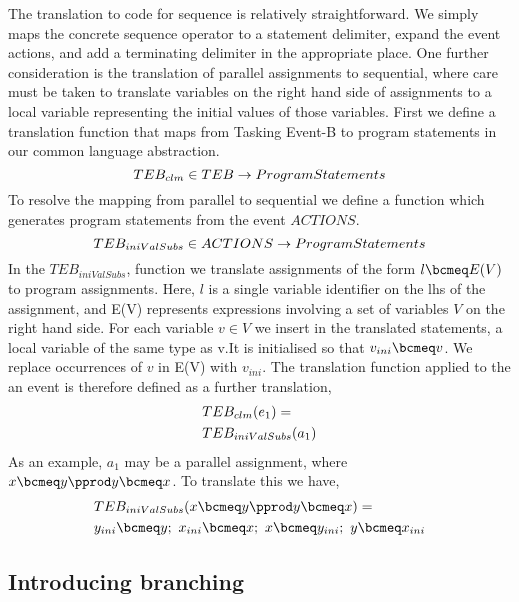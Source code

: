 The translation to code for sequence is relatively straightforward. We simply maps the concrete sequence operator to a statement delimiter, expand the event actions, and add a terminating delimiter in the appropriate place. One further consideration is the translation of parallel assignments to sequential, where care must be taken to translate variables on the right hand side of assignments to a local variable representing the initial values of those variables. First we define a translation function that maps from Tasking Event-B to program statements in our common language abstraction.   
\begin{equation}
TEB_{clm} \in  TEB \rightarrow ProgramStatements
\notag
\end{equation}
To resolve the mapping from parallel to sequential we define a function which generates program statements from the event $ACTIONS$. 
\begin{equation}
TEB_{iniValSubs} \in  ACTIONS \rightarrow ProgramStatements
\notag
\end{equation}
In the $TEB_{iniValSubs}$, function we translate assignments of the form $l \bcmeq E(V)$ to program assignments. Here, $l$ is a single variable identifier on the lhs of the assignment, and  E(V) represents expressions involving a set of variables $V$ on the right hand side. For each variable $v \in V$ we insert in the translated statements, a local variable of the same type as v.It is initialised so that $v_{ini} \bcmeq v$. We replace occurrences of $v$ in E(V) with $v_{ini}$. The translation function applied to the an event is therefore defined as a further translation,
%
\begin{equation}
\begin{split}
&TEB_{clm}(e_1) = \\
&TEB_{iniValSubs}(a_1)
\end{split}
\notag
\end{equation}
%
As an example, $a_1$ may be a parallel assignment, where $x \bcmeq y \pprod y \bcmeq x$. To translate this we have,
%
\begin{equation}
\begin{split}
&TEB_{iniValSubs}(x \bcmeq y \pprod y \bcmeq x) =\\
&y_{ini} \bcmeq y;~ x_{ini} \bcmeq x;~ x \bcmeq y_{ini};~ y \bcmeq x_{ini}  
\end{split}
\notag
\end{equation}
%  

\subsection{Introducing branching}


